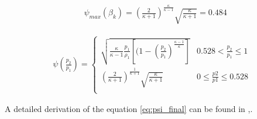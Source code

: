 \begin{align}
    &\psi_{max} (\beta_k) = 
    \left(\frac{2}{\kappa+1}\right)^\frac{\kappa}{\kappa-1}\sqrt{\frac{\kappa}{\kappa+1}}
    = 0.484
    \label{eq:psi_max}
\end{align}

\begin{align}
\psi\left(\frac{p_2}{p_1}\right) = 
    \begin{cases}
    \sqrt{\frac{\kappa}{\kappa-1} \frac{p_1}{\rho_1} 
    \left[(1-\left(\frac{p_2}{p_1}\right)^\frac{\kappa-1}{\kappa}\right]}
    & 0.528 <\frac{p_2}{p_1} \le 1 \\
    \left(\frac{2}{\kappa +1}\right)^{\frac{1}{\kappa+1}}
    \sqrt{\frac{\kappa}{\kappa +1}} & 0 \le \frac{p2}{p1} \le 0.528\\
    \end{cases}
\label{eq:psi_final}
\end{align}

A detailed derivation of the equation \ref{eq:psi_final} can be found in
\cite{isermann},\cite{}.


